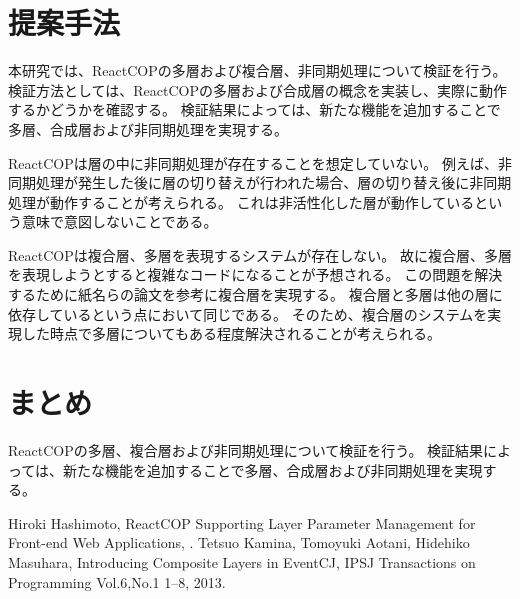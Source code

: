 \documentclass[twocolumn]{jarticle}
\begin{document}
\section{提案手法}
本研究では、ReactCOPの多層および複合層、非同期処理について検証を行う。
検証方法としては、ReactCOPの多層および合成層の概念を実装し、実際に動作するかどうかを確認する。
検証結果によっては、新たな機能を追加することで多層、合成層および非同期処理を実現する。

ReactCOPは層の中に非同期処理が存在することを想定していない。
例えば、非同期処理が発生した後に層の切り替えが行われた場合、層の切り替え後に非同期処理が動作することが考えられる。
これは非活性化した層が動作しているという意味で意図しないことである。

ReactCOPは複合層、多層を表現するシステムが存在しない。
故に複合層、多層を表現しようとすると複雑なコードになることが予想される。
この問題を解決するために紙名らの論文\cite{composite_layer}を参考に複合層を実現する。
複合層と多層は他の層に依存しているという点において同じである。
そのため、複合層のシステムを実現した時点で多層についてもある程度解決されることが考えられる。



\section{まとめ}
ReactCOPの多層、複合層および非同期処理について検証を行う。
検証結果によっては、新たな機能を追加することで多層、合成層および非同期処理を実現する。

\begin{thebibliography}{1}
Hiroki Hashimoto, ReactCOP Supporting Layer Parameter Management for Front-end Web Applications, .
Tetsuo Kamina, Tomoyuki Aotani, Hidehiko Masuhara, Introducing Composite Layers in EventCJ, IPSJ Transactions on Programming Vol.6,No.1 1–8, 2013.
\end{thebibliography}
\end{document}
